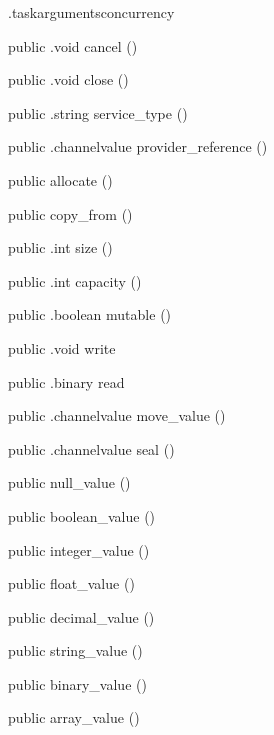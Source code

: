 \begin{CrexxClass}{.taskarguments}{concurrency}
\begin{Members}
    \Method
      {public}
      {.void}
      {cancel}
      {()}

    \Method
      {public}
      {.void}
      {close}
      {()}

    \Method
      {public}
      {.string}
      {service\_type}
      {()}

    \Method
      {public}
      {.channelvalue}
      {provider\_reference}
      {()}

    \Factory
      {public}
      {allocate}
      {()}

    \Factory
      {public}
      {copy\_from}
      {()}

    \Method
      {public}
      {.int}
      {size}
      {()}

    \Method
      {public}
      {.int}
      {capacity}
      {()}

    \Method
      {public}
      {.boolean}
      {mutable}
      {()}

    \Method
      {public}
      {.void}
      {write}
      {}

    \Method
      {public}
      {.binary}
      {read}
      {}

    \Method
      {public}
      {.channelvalue}
      {move\_value}
      {()}

    \Method
      {public}
      {.channelvalue}
      {seal}
      {()}

    \Factory
      {public}
      {null\_value}
      {()}

    \Factory
      {public}
      {boolean\_value}
      {()}

    \Factory
      {public}
      {integer\_value}
      {()}

    \Factory
      {public}
      {float\_value}
      {()}

    \Factory
      {public}
      {decimal\_value}
      {()}

    \Factory
      {public}
      {string\_value}
      {()}

    \Factory
      {public}
      {binary\_value}
      {()}

    \Factory
      {public}
      {array\_value}
      {()}


\end{Members}
\end{CrexxClass}
